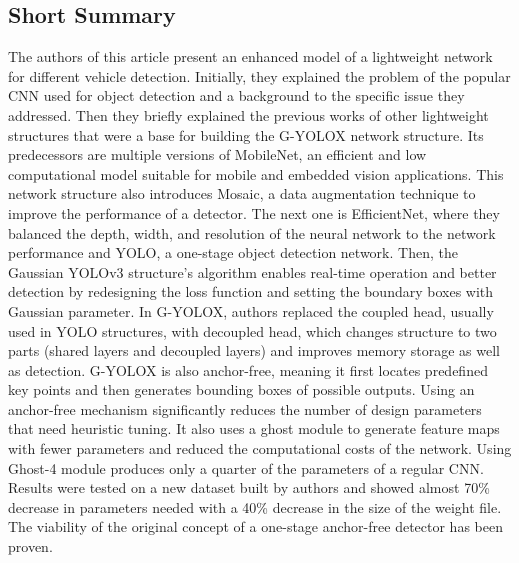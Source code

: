 \documentclass[11pt,a4paper]{article}
\begin{document}
\subsection*{Short Summary} 
The authors of this article present an enhanced model of a lightweight network for different vehicle detection. Initially, they explained the problem of the popular CNN used for object detection and a background to the specific issue they addressed. Then they briefly explained the previous works of other lightweight structures that were a base for building the G-YOLOX network structure. Its predecessors are multiple versions of MobileNet, an efficient and low computational model suitable for mobile and embedded vision applications. This network structure also introduces Mosaic, a data augmentation technique to improve the performance of a detector. The next one is EfficientNet, where they balanced the depth, width, and resolution of the neural network to the network performance and YOLO, a one-stage object detection network. Then, the Gaussian YOLOv3 structure’s algorithm enables real-time operation and better detection by redesigning the loss function and setting the boundary boxes with Gaussian parameter. In G-YOLOX, authors replaced the coupled head, usually used in YOLO structures, with decoupled head, which changes structure to two parts (shared layers and decoupled layers) and improves memory storage as well as detection. G-YOLOX is also anchor-free, meaning it first locates predefined key points and then generates bounding boxes of possible outputs. Using an anchor-free mechanism significantly reduces the number of design parameters that need heuristic tuning. It also uses a ghost module to generate feature maps with fewer parameters and reduced the computational costs of the network. Using Ghost-4 module produces only a quarter of the parameters of a regular CNN. Results were tested on a new dataset built by authors and showed almost 70\% decrease in parameters needed with a 40\% decrease in the size of the weight file. The viability of the original concept of a one-stage anchor-free detector has been proven. 
\end{document}
